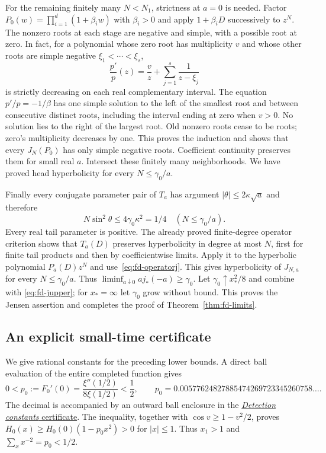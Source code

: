 For the remaining finitely many $N<N_1$, strictness at $a=0$ is
needed.  Factor $P_0(w)=\prod_{i=1}^d(1+\beta_iw)$ with
$\beta_i>0$ and apply $1+\beta_iD$ successively to $z^N$.
The nonzero roots at each stage are negative and simple, with a
possible root at zero.  In fact, for a polynomial whose zero root
has multiplicity $v$ and whose other roots are simple negative
$\xi_1<\cdots<\xi_s$,
\[
 \frac{p'}p(z)=\frac vz+\sum_{j=1}^s\frac1{z-\xi_j}
\]
is strictly decreasing on each real complementary interval.
The equation $p'/p=-1/\beta$ has one simple solution to the left
of the smallest root and between consecutive distinct roots,
including the interval ending at zero when $v>0$.
No solution lies to the right of the largest root.  Old nonzero
roots cease to be roots; zero's multiplicity decreases by one.
This proves the induction and shows that every $J_N(P_0)$ has
only simple negative roots.  Coefficient continuity preserves them
for small real $a$.  Intersect these finitely many neighborhoods.
We have proved head hyperbolicity for every $N\le\gamma_0/a$.

Finally every conjugate parameter pair of $T_a$ has argument
$|\theta|\le2\kappa\sqrt a$ and therefore
\[
 N\sin^2\theta\le4\gamma_0\kappa^2=1/4
 \quad (N\le\gamma_0/a).
\]
Every real tail parameter is positive.  The already proved
finite-degree operator criterion shows that $T_a(D)$ preserves
hyperbolicity in degree at most $N$, first for finite tail products
and then by coefficientwise limits.  Apply it to the hyperbolic
polynomial $P_a(D)z^N$ and use~\eqref{eq:fd-operatorj}.
This gives hyperbolicity of $J_{N,a}$ for every $N\le\gamma_0/a$.
Thus
$\liminf_{a\downarrow0}a j_*(-a)\ge\gamma_0$.
Let $\gamma_0\uparrow x_*^2/8$ and combine with
\eqref{eq:fd-jupper}; for $x_*=\infty$ let $\gamma_0$ grow without
bound.  This proves the Jensen assertion and completes the proof
of Theorem~\ref{thm:fd-limits}.

\subsection{An explicit small-time certificate}

We give rational constants for the preceding lower bounds.
A direct ball evaluation of the entire completed function gives
\[
 0<p_0:=F_0'(0)=\frac{\xi''(1/2)}{8\xi(1/2)}<\frac12,
 \qquad
 p_0=0.00577624827885474269723345260758\ldots .
\]
The decimal is accompanied by an outward ball enclosure in the
\href{\workbenchurl}{\emph{Detection constants} certificate}.
The inequality, together with $\cos v\ge1-v^2/2$, proves
$H_0(x)\ge H_0(0)(1-p_0x^2)>0$ for $|x|\le1$.
Thus $x_1>1$ and $\sum_xx^{-2}=p_0<1/2$.

